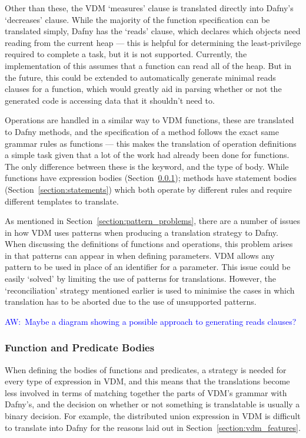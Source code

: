\documentclass{entcs}
\newcommand{\awcomment}[1]{\ifthenelse { \boolean{showComments} } {\textcolor{blue}{AW:~#1}} { } } %
\begin{document}
Other than these, the VDM `measures' clause is translated directly into Dafny's `decreases' clause. While the majority of the function specification can be translated simply, Dafny has the `reads' clause, which declares which objects need reading from the current heap --- this is helpful for determining the least-privilege required to complete a task, but it is not supported. Currently, the implementation of this assumes that a function can read all of the heap. But in the future, this could be extended to automatically generate minimal reads clauses for a function, which would greatly aid in parsing whether or not the generated code is accessing data that it shouldn't need to.

Operations are handled in a similar way to VDM functions, these are translated to Dafny methods, and the specification of a method follows the exact same grammar rules as functions --- this makes the translation of operation definitions a simple task given that a lot of the work had already been done for functions. The only difference between these is the keyword, and the type of body. While functions have expression bodies (Section~\ref{section:expressions}); methods have statement bodies (Section~\ref{section:statements}) which both operate by different rules and require different templates to translate.

As mentioned in Section~\ref{section:pattern_problems}, there are a number of issues in how VDM uses patterns when producing a translation strategy to Dafny. When discussing the definitions of functions and operations, this problem arises in that patterns can appear in when defining parameters. VDM allows any pattern to be used in place of an identifier for a parameter. This issue could be easily `solved' by limiting the use of patterns for translations. However, the `reconciliation' strategy mentioned earlier is used to minimise the cases in which translation has to be aborted due to the use of unsupported patterns.

\awcomment{Maybe a diagram showing a possible approach to generating reads clauses?}

\subsubsection{Function and Predicate Bodies}\label{section:expressions}

When defining the bodies of functions and predicates, a strategy is needed for every type of expression in VDM, and this means that the translations become less involved in terms of matching together the parts of VDM's grammar with Dafny's, and the decision on whether or not something is translatable is usually a binary decision. For example, the distributed union expression in VDM is difficult to translate into Dafny for the reasons laid out in Section~\ref{section:vdm_features}. 
\end{document}
